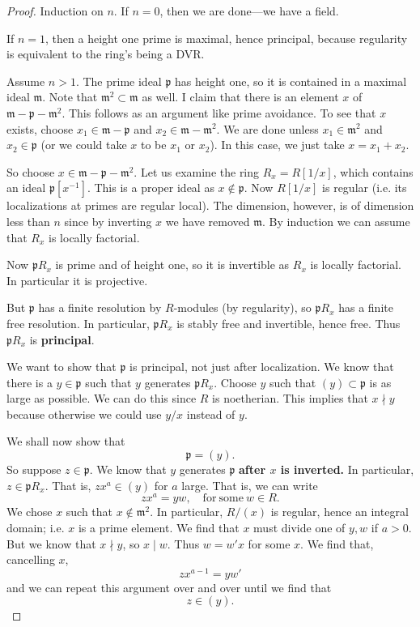 \begin{proof} 
Induction on $n$. If $n=0$, then we are done---we have a field. 

If $n=1$, then a height one prime is maximal, hence principal, because
regularity is equivalent to the ring's being a DVR. 

Assume $n>1$.  The prime ideal $\mathfrak{p}$ has height one, so it is
contained in  a maximal ideal $\mathfrak{m}$. Note that $\mathfrak{m}^2
\subset \mathfrak{m}$ as well. I claim that there is an element $x$ of
$\mathfrak{m} - \mathfrak{p} - \mathfrak{m}^2$. This follows as an argument
like prime avoidance. To see that $x$ exists, choose $x_1 \in \mathfrak{m} - \mathfrak{p}$ and $x_2
\in \mathfrak{m} - \mathfrak{m}^2$. We are done unless $x_1 \in
\mathfrak{m}^2$ and $x_2 \in \mathfrak{p}$ (or we could take $x$ to be $x_1$
or $x_2$). In this case, we just take $x = x_1 + x_2$.

So choose $x \in \mathfrak{m} - \mathfrak{p} - \mathfrak{m}^2$. Let us examine
the ring $R_{x} = R[1/x]$, which contains an ideal $\mathfrak{p}[x^{-1}]$.
This is a proper ideal as $x \notin \mathfrak{p}$. Now $R[1/x]$ is regular
(i.e. its localizations at primes are regular local). The dimension, however,
is of dimension less than $n$ since by inverting $x$ we have removed
$\mathfrak{m}$. By induction we can assume that $R_x$ is locally factorial.

Now $\mathfrak{p}R_{x}$ is prime and of height one, so it is invertible as
$R_x$ is locally factorial.
In particular it is projective.

But $\mathfrak{p}$ has a finite resolution by $R$-modules (by regularity), so
$\mathfrak{p}R_x$ has a finite free resolution. In particular,
$\mathfrak{p}R_{x}$ is stably free and invertible, hence free. 
Thus $\mathfrak{p}R_x$ is \textbf{principal}.

We want to show that $\mathfrak{p}$ is principal, not just after localization.
We know that there is a $y \in \mathfrak{p}$ such that $y$ generates
$\mathfrak{p}R_x$. Choose $y$ such that $(y) \subset \mathfrak{p}$ is as large
as possible. We can do this since $R$ is noetherian. This implies that $x
\nmid y$ because otherwise we could use $y/x$ instead of $y$. 

We shall now show that
\[ \mathfrak{p} = (y).  \]
So suppose $z \in \mathfrak{p}$. We know that $y$ generates $\mathfrak{p}$
\textbf{after $x$ is inverted.} In particular, $z \in \mathfrak{p}R_x$. That
is, $zx^a \in (y)$ for $a$ large.  That is, we can write
\[ zx^a = yw, \quad \mathrm{for \ some} \ w \in R . \]
We chose $x$ such that $x \notin \mathfrak{m}^2$. In particular, $R/(x)$ is
regular, hence an integral domain; i.e. $x$ is a prime element. We find that
$x$ must divide one of $y,w$ if $a>0$. But we know that $x \nmid y$, so $x
\mid w$.  Thus $w = w'x$ for some $x$. We find that, cancelling $x$,
\[ zx^{a-1} = yw'  \]
and we can repeat this argument over and over until we find that 
\[ z \in (y).  \]
\end{proof} 



